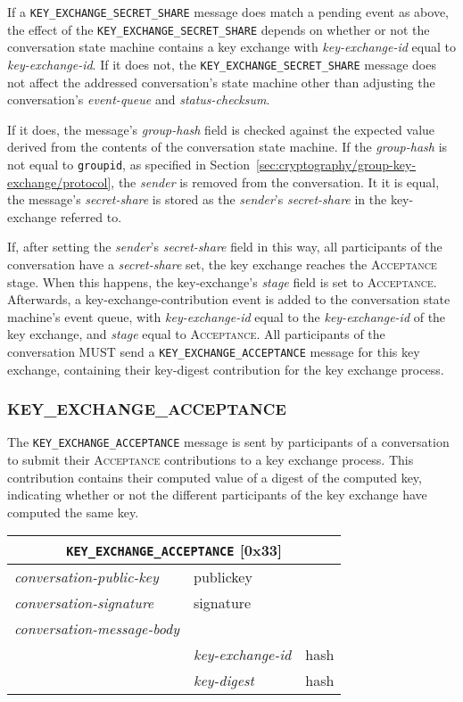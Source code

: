 \documentclass{article}
\def\npmessage#1{\texttt{#1}}
\def\field#1{\textit{#1}}
\def\smfield#1{\textsl{#1}}
\def\type#1{\textsf{#1}}
\newenvironment{conversationmessage}[2]{
\newcommand{\messagefield}[2]{
& \field{##1} & \type{##2} \\
\hline
}
\hspace{2em minus 2em}\begin{tabular}{|l|l|l|}
\hline
\multicolumn{3}{|c|}{\npmessage{#1} [#2]} \\
\hline
\hline
\field{conversation-public-key} & \multicolumn{2}{l|}{\type{publickey}} \\
\hline
\field{conversation-signature} & \multicolumn{2}{l|}{\type{signature}} \\
\hline
\field{conversation-message-body} & \multicolumn{2}{l|}{} \\
\hline
}{
\end{tabular}
}
\begin{document}
If a \npmessage{KEY\_EXCHANGE\_SECRET\_SHARE} message does match a pending event as above, the effect of the \npmessage{KEY\_EXCHANGE\_SECRET\_SHARE} depends on whether or not the conversation state machine contains a key exchange with \smfield{key-exchange-id} equal to \field{key-exchange-id}.
If it does not, the \npmessage{KEY\_EXCHANGE\_SECRET\_SHARE} message does not affect the addressed conversation's state machine other than adjusting the conversation's \smfield{event-queue} and \smfield{status-checksum}.

If it does, the message's \field{group-hash} field is checked against the expected value derived from the contents of the conversation state machine.
If the \field{group-hash} is not equal to \texttt{groupid}, as specified in Section~\ref{sec:cryptography/group-key-exchange/protocol}, the \field{sender} is removed from the conversation.
It it is equal, the message's \field{secret-share} is stored as the \field{sender}'s \smfield{secret-share} in the \type{key-exchange} referred to.

If, after setting the \field{sender}'s \smfield{secret-share} field in this way, all participants of the conversation have a \smfield{secret-share} set, the key exchange reaches the \textsc{Acceptance} stage.
When this happens, the \type{key-exchange}'s \smfield{stage} field is set to \textsc{Acceptance}.
Afterwards, a \type{key-exchange-contribution} event is added to the conversation state machine's event queue, with \smfield{key-exchange-id} equal to the \smfield{key-exchange-id} of the key exchange, and \smfield{stage} equal to \textsc{Acceptance}.
All participants of the conversation MUST send a \npmessage{KEY\_EXCHANGE\_ACCEPTANCE} message for this key exchange, containing their key-digest contribution for the key exchange process.


\subsubsection{KEY\_EXCHANGE\_ACCEPTANCE}
\label{sec:messages/key-exchange-acceptance}

The \npmessage{KEY\_EXCHANGE\_ACCEPTANCE} message is sent by participants of a conversation to submit their \textsc{Acceptance} contributions to a key exchange process.
This contribution contains their computed value of a digest of the computed key, indicating whether or not the different participants of the key exchange have computed the same key.

\begin{conversationmessage}{KEY\_EXCHANGE\_ACCEPTANCE}{0x33}
\messagefield{key-exchange-id}{hash}
\messagefield{key-digest}{hash}
\end{conversationmessage}
\end{document}
